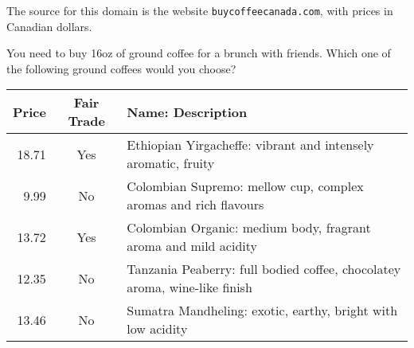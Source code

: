 The source for this domain is the website \texttt{buycoffeecanada.com}, with prices in Canadian dollars.

\begin{tcolorbox}
You need to buy 16oz of ground coffee for a brunch with friends.
Which one of the following ground coffees would you choose?

\begin{tabular}{rcl}
\hline
Price & Fair Trade & Name: Description \\
\hline
18.71 & Yes & Ethiopian Yirgacheffe: vibrant and intensely aromatic, fruity \\
9.99 & No & Colombian Supremo: mellow cup, complex aromas and rich flavours \\
13.72 & Yes & Colombian Organic: medium body, fragrant aroma and mild acidity \\
12.35 & No & Tanzania Peaberry: full bodied coffee, chocolatey aroma, wine-like finish \\
13.46 & No & Sumatra Mandheling: exotic, earthy, bright with low acidity \\
\hline
\end{tabular}
\end{tcolorbox}

